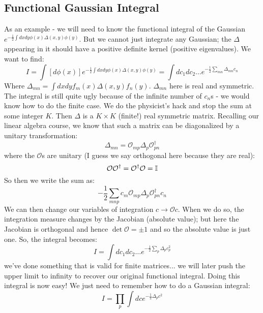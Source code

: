 \subsection{Functional Gaussian Integral}
As an example - we will need to know the functional integral of the Gaussian $e^{-\frac{1}{2}\int dxdy \phi(x)\Delta(x, y)\phi(y)}
$. But we cannot just integrate any Gaussian; the $\Delta$ appearing in it should have a positive definite kernel (positive eigenvalues). We want to find:
\begin{equation}
    I = \int [d\phi(x)]e^{-\frac{1}{2}\int dxdy \phi(x)\Delta(x, y)\phi(y)} = \int dc_1dc_2\ldots e^{-\frac{1}{2}\sum_{mn}\Delta_{mn}c_n}
\end{equation}
Where $\Delta_{mn} = \int dxdy f_m(x)\Delta(x, y)f_n(y)$. $\Delta_{mn}$ here is real and symmetric. The integral is still quite ugly because of the infinite number of $c_n$s - we would know how to do the finite case. We do the physicist's hack and stop the sum at some integer $K$. Then $\Delta$ is a $K \times K$ (finite!) real symmetric matrix. Recalling our linear algebra course, we know that such a matrix can be diagonalized by a unitary transformation:
\begin{equation}
    \Delta_{mn} = \mathcal{O}_{mp}\Delta_p \mathcal{O}^\dag_{pn}
\end{equation}
where the $\mathcal{O}$s are unitary (I guess we say orthogonal here because they are real):
\begin{equation}
    \mathcal{O}\mathcal{O}^\dagger = \mathcal{O}^\dagger\mathcal{O} = \mathbb{I}
\end{equation}
So then we write the sum as:
\begin{equation}
    -\frac{1}{2}\sum_{mnp}c_m\mathcal{O}_{mp}\Delta_p \mathcal{O}^\dag_{pn}c_n
\end{equation}
We can then change our variables of integration $c \to \mathcal{O}c$. When we do so, the integration measure changes by the Jacobian (absolute value); but here the Jacobian is orthogonal and hence $\det\mathcal{O} = \pm 1$ and so the absolute value is just one. So, the integral becomes:
\begin{equation}
    I = \int dc_1dc_2 \ldots e^{-\frac{1}{2}\sum_p \Delta_p c_p^2}
\end{equation}
we've done something that is valid for finite matrices... we will later push the upper limit to infinity to recover our original functional integral. Doing this integral is now easy! We just need to remember how to do a Gaussian integral:
\begin{equation}
    I = \prod_p \int dc e^{-\frac{1}{2}\Delta_p c^2}
\end{equation}
